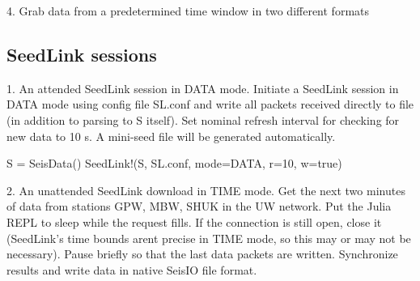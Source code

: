 \documentclass[letterpaper,11pt,english]{sphinxmanual}
\begin{document}
4. Grab data from a predetermined time window in two different formats

\begin{sphinxVerbatim}[commandchars=\\\{\}]
  
  
      
      
\end{sphinxVerbatim}


\subsection{SeedLink sessions}
\label{\detokenize{src/Appendices/examples:seedlink-sessions}}
1. An attended SeedLink session in DATA mode. Initiate a SeedLink session in DATA mode using config file SL.conf and write all packets received directly to file (in addition to parsing to S itself). Set nominal refresh interval for checking for new data to 10 s. A mini-seed file will be generated automatically.

\begin{sphinxVerbatim}[commandchars=\\\{\}]
S = SeisData()
SeedLink!(S, \PYGZdq{}SL.conf\PYGZdq{}, mode=\PYGZdq{}DATA\PYGZdq{}, r=10, w=true)
\end{sphinxVerbatim}

2. An unattended SeedLink download in TIME mode. Get the next two minutes of data from stations GPW, MBW, SHUK in the UW network. Put the Julia REPL to sleep while the request fills. If the connection is still open, close it (SeedLink’s time bounds arent precise in TIME mode, so this may or may not be necessary). Pause briefly so that the last data packets are written. Synchronize results and write data in native SeisIO file format.
\end{document}
